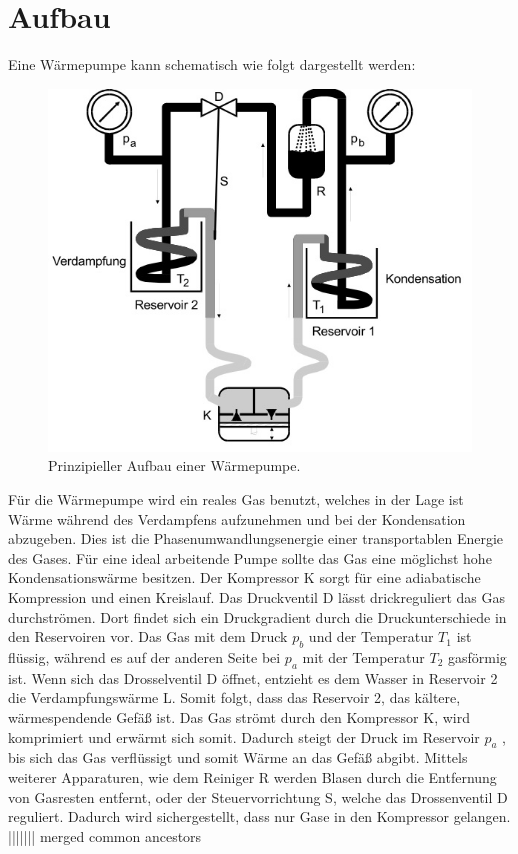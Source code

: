 \section{Aufbau}
\label{sec:Aufbau}
Eine Wärmepumpe kann schematisch wie folgt dargestellt werden:
\begin{figure}
  \centering
  \includegraphics{data/Abb1.jpg}
  \caption{Prinzipieller Aufbau einer Wärmepumpe. \cite{AnleitungV206}}
  \label{fig:Abb1}
\end{figure}
Für die Wärmepumpe wird ein reales Gas benutzt, welches in der Lage ist Wärme während des Verdampfens aufzunehmen und bei der Kondensation abzugeben.
Dies ist die Phasenumwandlungsenergie einer transportablen Energie des Gases.
Für eine ideal arbeitende Pumpe sollte das Gas eine möglichst hohe Kondensationswärme besitzen.
Der Kompressor K sorgt für eine adiabatische Kompression und einen Kreislauf.
Das Druckventil D lässt drickreguliert das Gas durchströmen.
Dort findet sich ein Druckgradient durch die Druckunterschiede in den Reservoiren vor.
Das Gas mit dem Druck $p_b$ und der Temperatur $T_1$ ist flüssig,
während es auf der anderen Seite bei $p_a$ mit der Temperatur $T_2$ gasförmig ist.
Wenn sich das Drosselventil D öffnet, entzieht es dem Wasser in Reservoir 2 die Verdampfungswärme L.
Somit folgt, dass das Reservoir 2, das kältere, wärmespendende Gefäß ist.
Das Gas strömt durch den Kompressor K, wird komprimiert und erwärmt sich somit.
Dadurch steigt der Druck im Reservoir $p_a$ , bis sich das Gas verflüssigt und somit Wärme an das Gefäß abgibt.
Mittels weiterer Apparaturen, wie dem Reiniger R werden Blasen durch die Entfernung von Gasresten entfernt,
oder der Steuervorrichtung S, welche das Drossenventil D reguliert.
Dadurch wird sichergestellt, dass nur Gase in den Kompressor gelangen.
||||||| merged common ancestors
